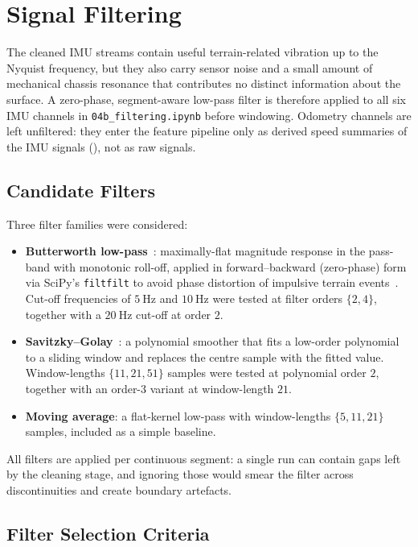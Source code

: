 \vspace{-8mm}
\section{Signal Filtering}
\label{sec:filtering}

The cleaned IMU streams contain useful terrain-related vibration up to the Nyquist frequency, but they also carry sensor noise and a small amount of mechanical chassis resonance that contributes no distinct information about the surface. A zero-phase, segment-aware low-pass filter is therefore applied to all six IMU channels in \texttt{04b\_filtering.ipynb} before windowing. Odometry channels are left unfiltered: they enter the feature pipeline only as derived speed summaries of the IMU signals (), not as raw signals.

\subsection{Candidate Filters}

Three filter families were considered:
\begin{itemize}
    \item \textbf{Butterworth low-pass}~\cite{Butterworth1930}: maximally-flat magnitude response in the pass-band with monotonic roll-off, applied in forward--backward (zero-phase) form via SciPy's \texttt{filtfilt} to avoid phase distortion of impulsive terrain events~\cite{Gustafsson1996}. Cut-off frequencies of $\SI{5}{\hertz}$ and $\SI{10}{\hertz}$ were tested at filter orders $\{2, 4\}$, together with a $\SI{20}{\hertz}$ cut-off at order $2$.
    \item \textbf{Savitzky--Golay}~\cite{Savitzky1964}: a polynomial smoother that fits a low-order polynomial to a sliding window and replaces the centre sample with the fitted value. Window-lengths $\{11, 21, 51\}$ samples were tested at polynomial order $2$, together with an order-$3$ variant at window-length $21$.
    \item \textbf{Moving average}: a flat-kernel low-pass with window-lengths $\{5, 11, 21\}$ samples, included as a simple baseline.
\end{itemize}
All filters are applied per continuous segment: a single run can contain gaps left by the cleaning stage, and ignoring those would smear the filter across discontinuities and create boundary artefacts.

\subsection{Filter Selection Criteria}

